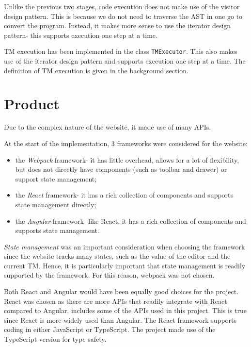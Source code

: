 Unlike the previous two stages, code execution does not make use of the visitor design pattern. This is because we do not need to traverse the AST in one go to convert the program. Instead, it makes more sense to use the iterator design pattern- this supports execution one step at a time.

TM execution has been implemented in the class \texttt{TMExecutor}. This also makes use of the iterator design pattern and supports execution one step at a time. The definition of TM execution is given in the background section.

\section{Product}
Due to the complex nature of the website, it made use of many APIs.

At the start of the implementation, 3 frameworks were considered for the website:
\begin{itemize}
    \item the \emph{Webpack} framework- it has little overhead, allows for a lot of flexibility, but does not directly have components (such as toolbar and drawer) or support state management;
    \item the \emph{React} framework- it has a rich collection of components and supports state management directly;
    \item the \emph{Angular} framework- like React, it has a rich collection of components and supports state management.
\end{itemize}

\emph{State management} was an important consideration when choosing the framework since the website tracks many states, such as the value of the editor and the current TM. Hence, it is particularly important that state management is readily supported by the framework. For this reason, webpack was not chosen.

Both React and Angular would have been equally good choices for the project. React was chosen as there are more APIs that readily integrate with React compared to Angular, includes some of the APIs used in this project. This is true since React is more widely used than Angular.
The React framework supports coding in either JavaScript or TypeScript. The project made use of the TypeScript version for type safety.

